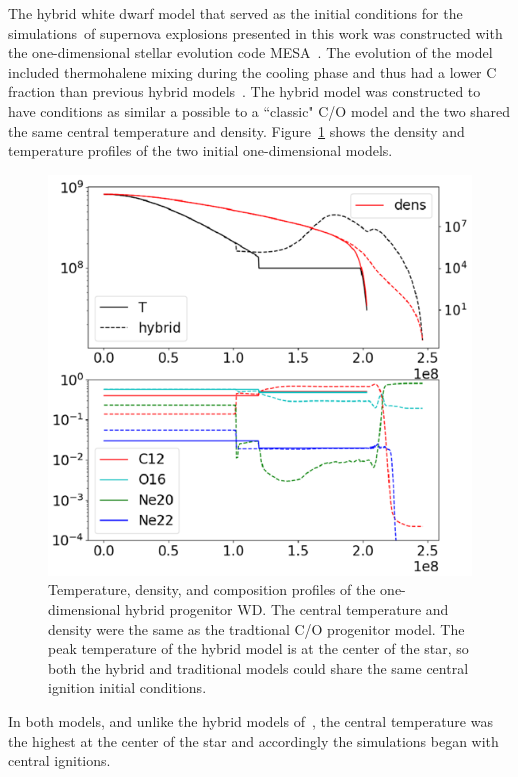\documentclass[iop,apj]{emulateapj}
\begin{document}
The hybrid white dwarf model that served as the initial conditions 
for the simulations of supernova explosions presented in this work
was constructed with the one-dimensional stellar evolution code 
MESA~\citep{mesa1,mesa2,mesa3,mesa3e}. The evolution of the model 
included thermohalene mixing during the cooling phase and thus
had a lower C fraction than previous hybrid models~\citep{brooksetal2017}.
The hybrid model was constructed to have conditions as similar a possible
to a ``classic" C/O model and the two shared the same central temperature
and density.  Figure~\ref{fig:init_conds} shows the density and temperature
profiles of the two initial one-dimensional models. 
\begin{figure}
\includegraphics[width=\columnwidth]{figures/initial_conds.png}
\caption{\label{fig:init_conds}
Temperature, density, and  composition profiles of the one-dimensional hybrid 
progenitor WD. The central temperature and density were the same as
the tradtional C/O progenitor model. 
The peak temperature of the hybrid model is at the center of the star, 
so both the hybrid and traditional models could share the same 
	central ignition initial conditions.
}
\end{figure}
In both models, and unlike the hybrid models of~\citet{willcoxetal2016}, the central
temperature was the highest at the center of the star and accordingly the simulations 
began with central ignitions. 
\end{document}
